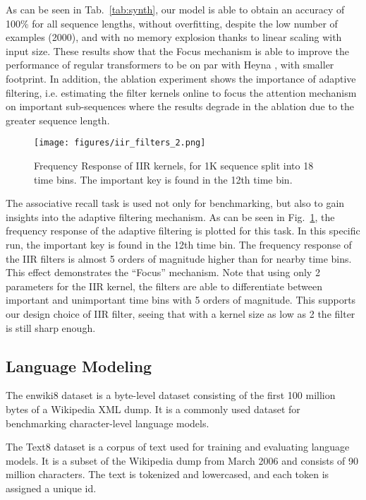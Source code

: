 \documentclass[11pt]{article}
\begin{document}
As can be seen in Tab.~\ref{tab:synth}, our model is able to obtain an accuracy of 100\% for all sequence lengths, without overfitting, despite the low number of examples (2000), and with no memory explosion thanks to linear scaling with input size. These results show that the Focus mechanism is able to improve the performance of regular transformers to be on par with Heyna \cite{poli2023hyena}, with smaller footprint.
In addition, the ablation experiment shows the importance of adaptive filtering, i.e. estimating the filter kernels online to focus the attention mechanism on important sub-sequences where the results degrade in the ablation due to the greater sequence length.
\begin{figure}[t]
    \centering
\texttt{[image: figures/iir\_filters\_2.png]}
    \caption{Frequency Response of IIR kernels, for 1K sequence split into 18 time bins. The important key is found in the 12th time bin.}
    \label{fig:Focusing_Effect}
\end{figure}

The associative recall task is used not only for benchmarking, but also to gain insights into the adaptive filtering mechanism.
As can be seen in Fig.~\ref{fig:Focusing_Effect}, the frequency response of the adaptive filtering is plotted for this task. In this specific run, the important key is found in the 12th time bin. The frequency response of the IIR filters is almost 5 orders of magnitude higher than for nearby time bins. This effect demonstrates the ``Focus'' mechanism. Note that using only 2 parameters for the IIR kernel, the filters are able to differentiate between important and unimportant time bins with 5 orders of magnitude. This supports our design choice of IIR filter, seeing that with a kernel size as low as 2 the filter is still sharp enough.


\subsection{Language Modeling}
The enwiki8 dataset is a byte-level dataset consisting of the first 100 million bytes of a Wikipedia XML dump. It is a commonly used dataset for benchmarking character-level language models. 

The Text8 dataset is a corpus of text used for training and evaluating language models. It is a subset of the Wikipedia dump from March 2006 and consists of 90 million characters. The text is tokenized and lowercased, and each token is assigned a unique id.
\end{document}

